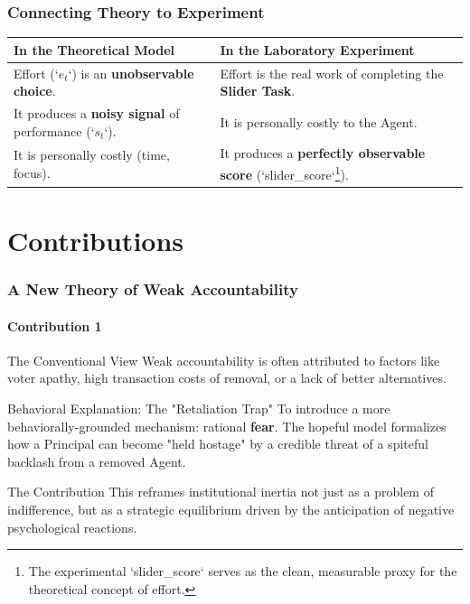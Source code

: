 \documentclass[10pt]{beamer}
\begin{document}
\begin{frame}
  \frametitle{Connecting Theory to Experiment}
  \begin{tabularx}{\textwidth}{| L{1} | L{1} |}
    \hline
    In the Theoretical Model & In the Laboratory Experiment \\
    \hline
    Effort (`$e_t$`) is an \textbf{unobservable choice}. & Effort is the real work of completing the \textbf{Slider Task}. \\
    \hdashline
    It produces a \textbf{noisy signal} of performance (`$s_t$`). &  It is personally costly to the Agent. \\
    \hdashline
    It is personally costly (time, focus). & It produces a \textbf{perfectly observable score} (`slider\_score`\footnote{\alert{The experimental `slider\_score` serves as the clean, measurable proxy for the theoretical concept of effort.}}). \\
    \hline
  \end{tabularx}
\end{frame}



\section{Contributions}
\begin{frame}
  \frametitle{A New Theory of Weak Accountability}
  \framesubtitle{Contribution 1}
  
  \begin{block}{The Conventional View}
    Weak accountability is often attributed to factors like voter apathy, high transaction costs of removal, or a lack of better alternatives.
  \end{block}
  
  \begin{block}{Behavioral Explanation: The "Retaliation Trap"}
    To introduce a more behaviorally-grounded mechanism: rational \textbf{fear}. The hopeful model formalizes how a Principal can become "held hostage" by a credible threat of a spiteful backlash from a removed Agent.
  \end{block}
  
  \begin{block}{The Contribution}
    This reframes institutional inertia not just as a problem of indifference, but as a strategic equilibrium driven by the anticipation of negative psychological reactions.
  \end{block}
\end{frame}
\end{document}
